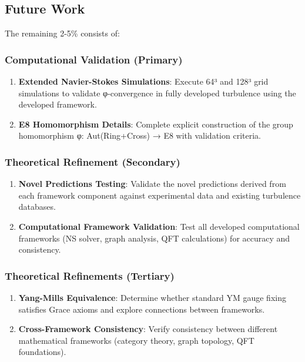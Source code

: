 \documentclass[12pt,a4paper]{article}
\begin{document}
\begin{itemize}
\begin{itemize}
\subsection{Future Work}

The remaining 2-5\% consists of:

\subsubsection{Computational Validation (Primary)}
\begin{enumerate}
\item \textbf{Extended Navier-Stokes Simulations}: Execute 64³ and 128³ grid simulations to validate φ-convergence in fully developed turbulence using the developed framework.

\item \textbf{E8 Homomorphism Details}: Complete explicit construction of the group homomorphism φ: Aut(Ring+Cross) → E8 with validation criteria.
\end{enumerate}

\subsubsection{Theoretical Refinement (Secondary)}
\begin{enumerate}
\item \textbf{Novel Predictions Testing}: Validate the novel predictions derived from each framework component against experimental data and existing turbulence databases.

\item \textbf{Computational Framework Validation}: Test all developed computational frameworks (NS solver, graph analysis, QFT calculations) for accuracy and consistency.
\end{enumerate}

\subsubsection{Theoretical Refinements (Tertiary)}
\begin{enumerate}
\item \textbf{Yang-Mills Equivalence}: Determine whether standard YM gauge fixing satisfies Grace axioms and explore connections between frameworks.

\item \textbf{Cross-Framework Consistency}: Verify consistency between different mathematical frameworks (category theory, graph topology, QFT foundations).
\end{enumerate}


\end{itemize}
\end{itemize}
\end{document}
